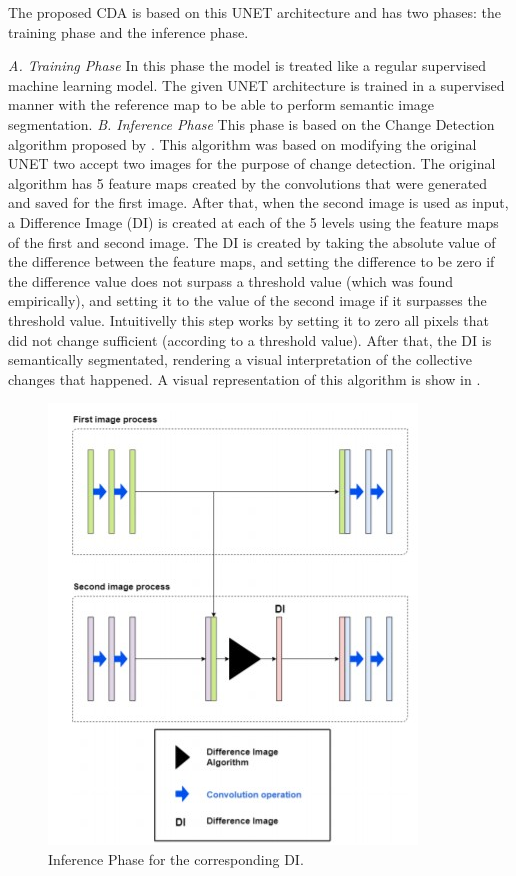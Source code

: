 The proposed CDA is based on this UNET architecture and has two phases: the training phase and the inference phase.

\textit{A. Training Phase}
\newline
In this phase the model is treated like a regular supervised machine learning model. The given UNET architecture is trained in a supervised manner with the reference map
to be able to perform semantic image segmentation. 
\newline
\textit{B. Inference Phase}
\newline
This phase is based on the Change Detection algorithm proposed by \cite{Kevin}. This algorithm was based on modifying the original UNET two accept two images for the purpose of change detection.
The original algorithm has 5 feature maps created by the convolutions that were generated and saved for the first image. After that, when the second image is used as input, a Difference Image (DI) is
created at each of the 5 levels using the feature maps of the first and second image.
The DI is created by taking the absolute value of the difference between the feature maps, and setting the difference to be zero if the difference value does not surpass a threshold value (which was found empirically), and setting it to 
the value of the second image if it surpasses the threshold value. Intuitivelly this step works by setting it to zero all pixels that did not change sufficient (according to a threshold value). After that, the DI is semantically segmentated, rendering a visual 
interpretation of the collective changes that happened. A visual representation of this algorithm is show in .

\begin{figure}[ht]
    \centering
    \includegraphics{Chapter7/kevin_algorithm.jpg}
    \caption{Inference Phase for the corresponding DI.}
    \label{fig:kevin_algorithm}
\end{figure}

